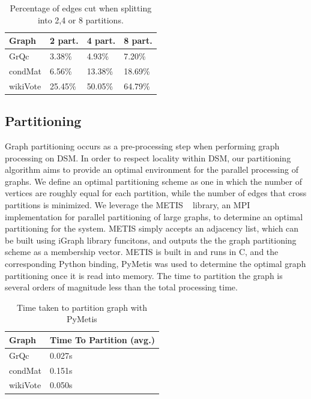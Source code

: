 \begin{table}[h]
\begin{tabularx}{\linewidth}{|X|X|X|X|}
\hline
Graph & 2 part. & 4 part. & 8 part. \\ \hline \hline
GrQc & 3.38\% & 4.93\% & 7.20\% \\ \hline
condMat & 6.56\% & 13.38\% & 18.69\% \\ \hline
wikiVote & 25.45\% & 50.05\% & 64.79\% \\ \hline
\end{tabularx}
\caption{Percentage of edges cut when splitting into 2,4 or 8 partitions.}
\end{table}

\subsection{Partitioning}

Graph partitioning occurs as a pre-processing step when performing graph processing
on DSM. In order to respect locality within DSM, our partitioning algorithm aims to 
provide an optimal environment for the parallel processing of graphs. We define an 
optimal partitioning scheme as one in which the number of vertices are roughly 
equal for each partition, while the number of edges that cross partitions is 
minimized. We leverage the METIS ~\cite{Lasalle:2013:metis} library, an MPI 
implementation for parallel partitioning of large graphs, to determine an optimal 
partitioning for the system. METIS simply accepts an adjacency list, which can be 
built using iGraph library funcitons, and outputs the the graph partitioning
scheme as a membership vector. METIS is built in and runs in C, and the corresponding
Python binding, PyMetis \cite{pymetis} was used to determine the optimal graph 
partitioning once it is read into memory. The time to partition the graph is
several orders of magnitude less than the total processing time.

\begin{table}[h]
\begin{tabularx}{\linewidth}{|X|X|}
\hline
Graph & Time To Partition (avg.) \\ \hline \hline
GrQc & 0.027s \\ \hline
condMat & 0.151s \\ \hline
wikiVote & 0.050s \\ \hline
\end{tabularx}
\caption{Time taken to partition graph with PyMetis}
\end{table}

